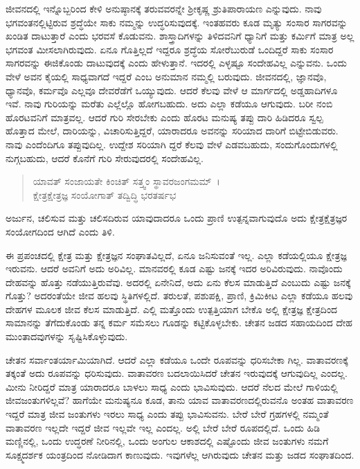 ಜೀವನದಲ್ಲಿ ಇನ್ನೊಬ್ಬರಿಂದ ಕೇಳಿ ಅನುಷ್ಠಾನಕ್ಕೆ ತರುವವರನ್ನೇ ಶ‍್ರೀಕೃಷ್ಣ ಶ್ರುತಿಪಾರಾಯಣ ಎನ್ನುವುದು. ನಾವು ಭಗವಂತನಲ್ಲಿಟ್ಟಿರುವ ಶ್ರದ್ಧೆಯೇ ಸಾಕು ನಮ್ಮನ್ನು ಉದ್ಧರಿಸುವುದಕ್ಕೆ. ಇಂತಹವರು ಕೂಡ ಮೃತ್ಯು ಸಂಸಾರ ಸಾಗರವನ್ನು ಖಂಡಿತ ದಾಟುತ್ತಾರೆ ಎಂದು ಭರವಸೆ ಕೊಡುವನು. ಶಾಸ್ತ್ರಾದಿಗಳನ್ನು ತಿಳಿದವನಿಗೆ ಧ್ಯಾನಿಗೆ ಮತ್ತು ಕರ್ಮಿಗೆ ಮಾತ್ರ ಅಲ್ಲ ಭಗವಂತ ಮೀಸಲಾಗಿರುವುದು. ಏನೂ ಗೊತ್ತಿಲ್ಲದೆ ಇದ್ದರೂ ಶ್ರದ್ಧೆಯ ಸೋರೆಬುರುಡೆ ಒಂದಿದ್ದರೆ ಸಾಕು ಸಂಸಾರ ಸಾಗರವನ್ನು ಈಜಿಕೊಂಡು ದಾಟುವುದಕ್ಕೆ ಎಂದು ಹೇಳುತ್ತಾನೆ. ಇದರಲ್ಲಿ ಎಳ್ಳಷ್ಟೂ ಸಂದೇಹವಿಲ್ಲ ಎನ್ನುವನು. ಒಂದು ವೇಳೆ ಅವನ ಕೈಯಲ್ಲಿ ಸಾಧ್ಯವಾಗದೆ ಇದ್ದರೆ ಎಂಬ ಅನುಮಾನ ನಮ್ಮಲ್ಲಿ ಬರುವುದು. ಜೀವನದಲ್ಲಿ, ಜ್ಞಾನವೊ, ಧ್ಯಾನವೊ, ಕರ್ಮವೊ ಎಲ್ಲವೂ ದೇವರೆಡೆಗೆ ಒಯ್ಯುವುದು. ಆದರೆ ಕೆಲವು ವೇಳೆ ಆ ಮಾರ್ಗದಲ್ಲಿ ಅಡ್ಡಹಾದಿಗಳೂ ಇವೆ. ನಾವು ಗುರಿಯನ್ನು ಮರೆತು ಎಲ್ಲೆಲ್ಲೊ ಹೋಗಬಹುದು. ಅದು ಎಲ್ಲಾ ಕಡೆಯೂ ಆಗುವುದು. ಬರೀ ನಂಬಿ ಹೊರಟವನಿಗೆ ಮಾತ್ರವಲ್ಲ. ಆದರೆ ಗುರಿ ಸೇರಬೇಕು ಎಂದು ಹೊರಟ ಮನುಷ್ಯ ತಪ್ಪು ದಾರಿ ಹಿಡಿದರೂ ಸ್ವಲ್ಪ ಹೊತ್ತಾದ ಮೇಲೆ, ದಾರಿಯನ್ನು, ವಿಚಾರಿಸುತ್ತಿದ್ದರೆ, ಯಾರಾದರೂ ಅವನನ್ನು ಸರಿಯಾದ ದಾರಿಗೆ ಬಿಟ್ಟೇಬಿಡುವರು. ನಾವು ಎಂದೆಂದಿಗೂ ತಪ್ಪುವುದಿಲ್ಲ. ಉದ್ದೇಶ ಸರಿಯಾಗಿ ದ್ದರೆ ಕೆಲವು ವೇಳೆ ಎಡವಬಹುದು, ಸಂದುಗೊಂದುಗಳಲ್ಲಿ ನುಗ್ಗಬಹುದು, ಆದರೆ ಕೊನೆಗೆ ಗುರಿ ಸೇರುವುದರಲ್ಲಿ ಸಂದೇಹವಿಲ್ಲ.

\begin{verse}
ಯಾವತ್ ಸಂಜಾಯತೇ ಕಿಂಚಿತ್ ಸತ್ತ್ವಂ ಸ್ಥಾವರಜಂಗಮಮ್~।\\ಕ್ಷೇತ್ರಕ್ಷೇತ್ರಜ್ಞ ಸಂಯೋಗಾತ್ ತದ್ವಿದ್ಧಿ ಭರತರ್ಷಭ 
\end{verse}

{\small ಅರ್ಜುನ, ಚಲಿಸುವ ಮತ್ತು ಚಲಿಸದಿರುವ ಯಾವುದಾದರೂ ಒಂದು ಪ್ರಾಣಿ ಉತ್ಪನ್ನವಾಗುವುದೊ ಅದು ಕ್ಷೇತ್ರಕ್ಷೆತ್ರಜ್ಞರ ಸಂಯೋಗದಿಂದ ಆಗಿದೆ ಎಂದು ತಿಳಿ.}

ಈ ಪ್ರಪಂಚದಲ್ಲಿ ಕ್ಷೇತ್ರ ಮತ್ತು ಕ್ಷೇತ್ರಜ್ಞನ ಸಂಘಾತವಿಲ್ಲದೆ, ಏನೂ ಜನಿಸುವಂತೆ ಇಲ್ಲ. ಎಲ್ಲಾ ಕಡೆಯಲ್ಲಿಯೂ ಕ್ಷೇತ್ರಜ್ಞ ಇರುವನು. ಆದರೆ ಅವನಿಗೆ ಅದು ಅರಿವಿಲ್ಲ. ಮಾನವರಲ್ಲಿ ಕೂಡ ಎಷ್ಟು ಜನಕ್ಕೆ ಇದರ ಅರಿವಿರುವುದು. ನಾವೊಂದು ದೇಹವನ್ನು ಹೊತ್ತು ನಡೆಯುತ್ತಿರುವೆವು. ಅದರಲ್ಲಿ ಏನೇನಿದೆ, ಅದು ಏನು ಕೆಲಸ ಮಾಡುತ್ತಿದೆ ಎಂಬುದು ಎಷ್ಟು ಜನಕ್ಕೆ ಗೊತ್ತು? ಅದರಂತೆಯೇ ಜೀವ ಹಲವು ಸ್ಥಿತಿಗಳಲ್ಲಿದೆ. ತರುಲತೆ, ಪಶುಪಕ್ಷಿ, ಪ್ರಾಣಿ, ಕ್ರಿಮಿಕೀಟ ಎಲ್ಲಾ ಕಡೆಯೂ ಹಲವು ದೇಹಗಳ ಮೂಲಕ ಜೀವ ಕೆಲಸ ಮಾಡುತ್ತಿದೆ. ಎಲ್ಲಿ ಮತ್ತೊಂದು ಉತ್ಪತ್ತಿಯಾಗ ಬೇಕೊ ಅಲ್ಲಿ ಕ್ಷೇತ್ರಜ್ಞ ಕ್ಷೇತ್ರದಿಂದ ಸಾಮಾನನ್ನು ತೆಗೆದುಕೊಂಡು ತನ್ನ ಕರ್ಮ ಸಮೆಸಲು ಗೂಡನ್ನು ಕಟ್ಟಿಕೊಳ್ಳಬೇಕು. ಚೇತನ ಜಡದ ಸಹಾಯದಿಂದ ದೇಹ ಮುಂತಾದವುಗಳನ್ನು ಸೃಷ್ಟಿಸಿಕೊಳ್ಳುವುದು.

ಚೇತನ ಸರ್ವಾಂತರ್ಯಾಮಿಯಾಗಿದೆ. ಆದರೆ ಎಲ್ಲಾ ಕಡೆಯೂ ಒಂದೇ ರೂಪವನ್ನು ಧರಿಸಬೇಕಾ ಗಿಲ್ಲ. ವಾತಾವರಣಕ್ಕೆ ತಕ್ಕಂತೆ ಅದು ರೂಪವನ್ನು ಧರಿಸುವುದು. ವಾತಾವರಣ ಬದಲಾಯಿಸಿದರೆ ಚೇತನ ಇರುವುದಕ್ಕೆ ಆಗುವುದಿಲ್ಲ ಎಂದಲ್ಲ. ಮೀನು ನೀರಿದ್ದರೆ ಮಾತ್ರ ಯಾರಾದರೂ ಬಾಳಲು ಸಾಧ್ಯ ಎಂದು ಭಾವಿಸುವುದು. ಆದರೆ ನೆಲದ ಮೇಲೆ ಗಾಳಿಯಲ್ಲಿ ಜೀವಜಂತುಗಳಿಲ್ಲವೆ? ಹಾಗೆಯೇ ಮನುಷ್ಯನೂ ಕೂಡ, ತಾನು ಯಾವ ವಾತಾವರಣದಲ್ಲಿರುವನೊ ಅಂತಹ ವಾತಾವರಣ ಇದ್ದರೆ ಮಾತ್ರ ಜೀವ ಜಂತುಗಳು ಇರಲು ಸಾಧ್ಯ ಎಂದು ತಪ್ಪು ಭಾವಿಸುವನು. ಬೇರೆ ಬೇರೆ ಗ್ರಹಗಳಲ್ಲಿ ನಮ್ಮಂತೆ ವಾತಾವರಣ ಇಲ್ಲದೇ ಇದ್ದರೆ ಜೀವ ಇಲ್ಲವೇ ಇಲ್ಲ ಎಂದಲ್ಲ. ಅಲ್ಲಿ ಬೇರೆ ಬೇರೆ ರೂಪದಲ್ಲಿದೆ. ಒಂದು ಹಿಡಿ ಮಣ್ಣಿನಲ್ಲಿ, ಒಂದು ಉದ್ಧರಣೆ ನೀರಿನಲ್ಲಿ, ಒಂದು ಅಂಗುಲ ಆಕಾಶದಲ್ಲಿ ಎಷ್ಟೊಂದು ಜೀವ ಜಂತುಗಳು ನಮಗೆ ಸೂಕ್ಷ್ಮದರ್ಶಕ ಯಂತ್ರದಿಂದ ನೋಡಿದಾಗ ಕಾಣುವುದು. ಇವುಗಳೆಲ್ಲ ಆಗಿರುವುದು ಚೇತನ ಮತ್ತು ಜಡದ ಸಂಘಾತದಿಂದ.

